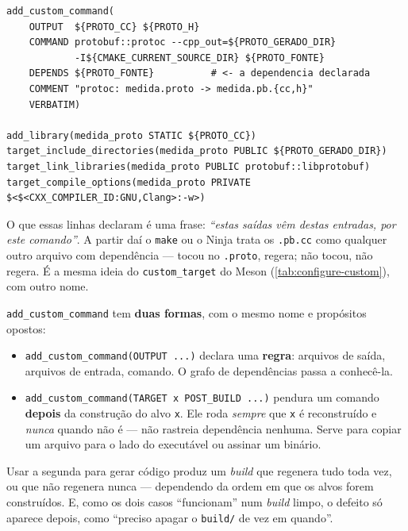 \begin{lstlisting}[style=bt, language=Meson,
    morekeywords={add_custom_command,add_library,target_include_directories,
                  target_link_libraries,target_compile_options,OUTPUT,COMMAND,
                  DEPENDS,COMMENT,VERBATIM,STATIC,PUBLIC,PRIVATE},
    caption={A regra, em \texttt{src/cmake/CMakeLists.txt}, seção 4.}]
add_custom_command(
    OUTPUT  ${PROTO_CC} ${PROTO_H}
    COMMAND protobuf::protoc --cpp_out=${PROTO_GERADO_DIR}
            -I${CMAKE_CURRENT_SOURCE_DIR} ${PROTO_FONTE}
    DEPENDS ${PROTO_FONTE}          # <- a dependencia declarada
    COMMENT "protoc: medida.proto -> medida.pb.{cc,h}"
    VERBATIM)

add_library(medida_proto STATIC ${PROTO_CC})
target_include_directories(medida_proto PUBLIC ${PROTO_GERADO_DIR})
target_link_libraries(medida_proto PUBLIC protobuf::libprotobuf)
target_compile_options(medida_proto PRIVATE $<$<CXX_COMPILER_ID:GNU,Clang>:-w>)
\end{lstlisting}

O que essas linhas declaram é uma frase: \emph{``estas saídas vêm destas
entradas, por este comando''}. A partir daí o \texttt{make} ou o Ninja trata os
\texttt{.pb.cc} como qualquer outro arquivo com dependência --- tocou no
\texttt{.proto}, regera; não tocou, não regera. É a mesma ideia do
\texttt{custom\_target} do Meson (\cref{tab:configure-custom}), com outro nome.

\begin{armadilha}
\texttt{add\_custom\_command} tem \textbf{duas formas}, com o mesmo nome e
propósitos opostos:
\begin{itemize}
    \item \texttt{add\_custom\_command(OUTPUT ...)} declara uma \textbf{regra}:
          arquivos de saída, arquivos de entrada, comando. O grafo de
          dependências passa a conhecê-la.
    \item \texttt{add\_custom\_command(TARGET x POST\_BUILD ...)} pendura um
          comando \textbf{depois} da construção do alvo \texttt{x}. Ele roda
          \emph{sempre} que \texttt{x} é reconstruído e \emph{nunca} quando não
          é --- não rastreia dependência nenhuma. Serve para copiar um arquivo
          para o lado do executável ou assinar um binário.
\end{itemize}
Usar a segunda para gerar código produz um \emph{build} que regenera tudo toda
vez, ou que não regenera nunca --- dependendo da ordem em que os alvos forem
construídos. E, como os dois casos ``funcionam'' num \emph{build} limpo, o
defeito só aparece depois, como ``preciso apagar o \texttt{build/} de vez em
quando''.
\end{armadilha}

